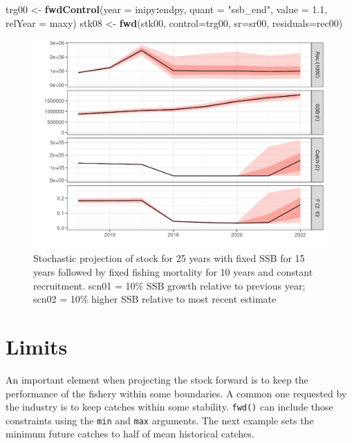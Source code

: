 \documentclass[
]{book}
\newenvironment{Shaded}{\begin{snugshade}}{\end{snugshade}}
\newcommand{\AttributeTok}[1]{\textcolor[rgb]{0.13,0.29,0.53}{#1}}
\newcommand{\FloatTok}[1]{\textcolor[rgb]{0.00,0.00,0.81}{#1}}
\newcommand{\FunctionTok}[1]{\textcolor[rgb]{0.13,0.29,0.53}{\textbf{#1}}}
\newcommand{\NormalTok}[1]{#1}
\newcommand{\OtherTok}[1]{\textcolor[rgb]{0.56,0.35,0.01}{#1}}
\newcommand{\SpecialCharTok}[1]{\textcolor[rgb]{0.81,0.36,0.00}{\textbf{#1}}}
\newcommand{\StringTok}[1]{\textcolor[rgb]{0.31,0.60,0.02}{#1}}
\begin{document}
\begin{Shaded}
\begin{Highlighting}[]
\NormalTok{trg00 }\OtherTok{\textless{}{-}} \FunctionTok{fwdControl}\NormalTok{(}\AttributeTok{year =}\NormalTok{ inipy}\SpecialCharTok{:}\NormalTok{endpy, }\AttributeTok{quant =} \StringTok{"ssb\_end"}\NormalTok{, }\AttributeTok{value =} \FloatTok{1.1}\NormalTok{, }\AttributeTok{relYear =}\NormalTok{ maxy)}
\NormalTok{stk08 }\OtherTok{\textless{}{-}} \FunctionTok{fwd}\NormalTok{(stk00, }\AttributeTok{control=}\NormalTok{trg00, }\AttributeTok{sr=}\NormalTok{sr00, }\AttributeTok{residuals=}\NormalTok{rec00)}
\end{Highlighting}
\end{Shaded}

\begin{figure}
\centering
\includegraphics{_bookdown_files/_main_files/figure-html/unnamed-chunk-129-1.png}
\caption{\label{fig:unnamed-chunk-129}Stochastic projection of stock for 25 years with fixed SSB for 15 years followed by fixed fishing mortality for 10 years and constant recruitment. scn01 = 10\% SSB growth relative to previous year; scn02 = 10\% higher SSB relative to most recent estimate}
\end{figure}

\hypertarget{limits}{%
\section{Limits}\label{limits}}

An important element when projecting the stock forward is to keep the performance of the fishery within some boundaries. A common one requested by the industry is to keep catches within some stability. \texttt{fwd()} can include those constraints using the \texttt{min} and \texttt{max} arguments. The next example sets the minimum future catches to half of mean historical catches.
\end{document}
